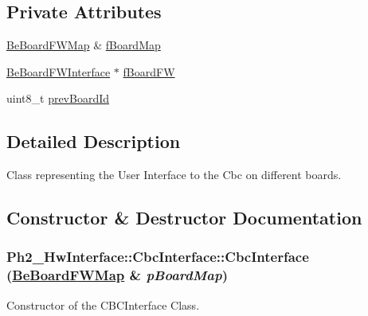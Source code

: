 \subsection*{Private Attributes}
\begin{CompactItemize}
\item 
\hyperlink{namespace_ph2___hw_interface_59fe3165f25ded62b5b12cf0ebc69e8d}{Be\-Board\-FWMap} \& \hyperlink{class_ph2___hw_interface_1_1_cbc_interface_0e34094468be36ee2c65e15f72178303}{f\-Board\-Map}
\item 
\hyperlink{class_ph2___hw_interface_1_1_be_board_f_w_interface}{Be\-Board\-FWInterface} $\ast$ \hyperlink{class_ph2___hw_interface_1_1_cbc_interface_8c37c0f580a1918fc11a207aff085a72}{f\-Board\-FW}
\item 
uint8\_\-t \hyperlink{class_ph2___hw_interface_1_1_cbc_interface_d4c28eff1e453e9954445f9fe02c16b6}{prev\-Board\-Id}
\end{CompactItemize}


\subsection{Detailed Description}
Class representing the User Interface to the Cbc on different boards. 



\subsection{Constructor \& Destructor Documentation}
\hypertarget{class_ph2___hw_interface_1_1_cbc_interface_405f25c67abece1967d0bd0d738afbe1}{
\subsubsection[CbcInterface]{\setlength{\rightskip}{0pt plus 5cm}Ph2\_\-Hw\-Interface::Cbc\-Interface::Cbc\-Interface (\hyperlink{namespace_ph2___hw_interface_59fe3165f25ded62b5b12cf0ebc69e8d}{Be\-Board\-FWMap} \& {\em p\-Board\-Map})}}
\label{class_ph2___hw_interface_1_1_cbc_interface_405f25c67abece1967d0bd0d738afbe1}


Constructor of the CBCInterface Class. 

